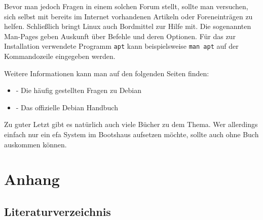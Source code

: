 \documentclass[a4paper,12pt,twoside]{article}
\begin{document}
Bevor man jedoch Fragen in
einem solchen Forum stellt, sollte man versuchen, sich selbst mit
bereits im Internet vorhandenen Artikeln oder Foreneinträgen zu helfen.
Schließlich bringt Linux auch Bordmittel zur Hilfe mit. Die sogenannten
Man-Pages geben Auskunft über Befehle und deren Optionen. Für das zur
Installation verwendete Programm \texttt{apt}
kann beispielsweise \texttt{man apt} auf der
Kommandozeile eingegeben werden.

Weitere Informationen kann man auf den folgenden Seiten finden:

\begin{itemize}
    \item \cite{HLP2} - Die häufig gestellten Fragen zu Debian
    \item \cite{HLP3} - Das offizielle Debian Handbuch
\end{itemize}

Zu guter Letzt gibt es natürlich auch viele Bücher zu dem Thema. Wer
allerdings einfach nur ein efa System im Bootshaus aufsetzen möchte,
sollte auch ohne Buch auskommen können.


\clearpage
\section{Anhang}
\label{sct:anhang}
\subsection{Literaturverzeichnis}
\label{sct:literatur}


\end{document}
